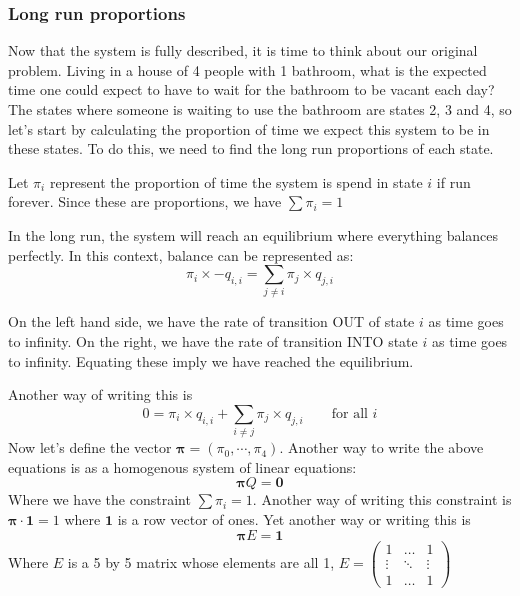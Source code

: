 \subsubsection*{Long run proportions}
Now that the system is fully described, it is time to think about our original problem. Living in a house of 4 people with 1 bathroom, what is the expected time one could expect to have to wait for the bathroom to be vacant each day? The states where someone is waiting to use the bathroom are states 2, 3 and 4, so let's start by calculating the proportion of time we expect this system to be in these states. To do this, we need to find the long run proportions of each state.

Let $\pi_i$ represent the proportion of time the system is spend in state $i$ if run forever. Since these are proportions, we have $\sum\pi_i = 1$

In the long run, the system will reach an equilibrium where everything balances perfectly. In this context, balance can be represented as:
$$ \pi_i  \times -q_{i, i} = \sum_{j \neq i} \pi_j \times q_{j, i} $$

On the left hand side, we have the rate of transition OUT of state $ i $ as time goes to infinity. On the right, we have the rate of transition INTO state $ i $ as time goes to infinity. Equating these imply we have reached the equilibrium.

Another way of writing this is
$$ 0 = \pi_i  \times q_{i, i} + \sum_{i \neq j} \pi_j \times q_{j, i} \qquad \text{for all  }i$$
Now let's define the vector $\boldsymbol{\pi}= (\pi_0, \cdots, \pi_4)$. Another way to write the above equations is as a homogenous system of linear equations:
$$ \boldsymbol{\pi}Q = \mathbf{0}$$
Where we have the constraint $ \sum\pi_i = 1 $. Another way of writing this constraint is $\boldsymbol{\pi} \cdot \mathbf{1} = 1$ where $\mathbf{1}$ is a row vector of ones. Yet another way or writing this is
$$\boldsymbol{\pi} E = \mathbf{1} $$
Where $E$ is a 5 by 5 matrix whose elements are all 1, 
$E = \begin{pmatrix}
1		&	\dots	& 1\\
\vdots	&	\ddots	& \vdots\\
1		&	\dots	& 1

\end{pmatrix}
$

